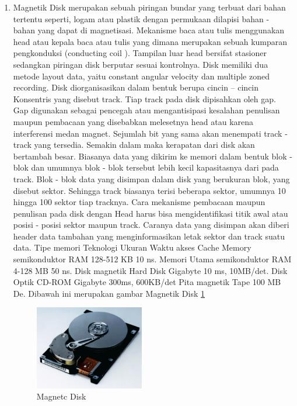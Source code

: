 \begin{enumerate}
\item Magnetik Disk merupakan sebuah piringan bundar yang terbuat dari bahan tertentu seperti, logam atau plastik dengan permukaan dilapisi bahan - bahan yang dapat di magnetisasi. Mekanisme baca atau tulis menggunakan head atau kepala baca atau tulis yang dimana merupakan sebuah kumparan pengkonduksi (conducting coil ). Tampilan luar head bersifat stasioner sedangkan piringan disk berputar sesuai kontrolnya. Disk memiliki dua metode layout data, yaitu  constant angular velocity dan multiple zoned recording. Disk diorganisasikan dalam bentuk berupa cincin – cincin
Konsentris yang disebut track. Tiap track pada disk dipisahkan oleh gap. Gap digunakan sebagai pencegah atau mengantisipasi kesalahan penulisan maupun pembacaan yang disebabkan melesetnya head atau karena interferensi medan magnet. Sejumlah bit yang sama akan menempati track - track yang tersedia. Semakin dalam maka kerapatan dari disk akan bertambah besar. Biasanya data yang dikirim ke memori dalam bentuk blok - blok dan umumnya blok - blok tersebut lebih kecil kapasitasnya dari pada track. Blok - blok data yang disimpan dalam disk yang berukuran blok, yang disebut sektor. Sehingga track biasanya terisi beberapa sektor, umumnya 10 hingga 100 sektor tiap tracknya. Cara mekanisme pembacaan maupun penulisan pada disk dengan Head harus bisa mengidentifikasi titik awal atau posisi - posisi sektor maupun track. Caranya data yang disimpan akan diberi header data tambahan yang menginformasikan letak sektor dan track suatu data. Tipe memori Teknologi Ukuran Waktu akses Cache Memory semikonduktor RAM 128-512 KB 10 ns. Memori Utama semikonduktor RAM 4-128 MB 50 ns. Disk magnetik Hard Disk Gigabyte 10 ms, 10MB/det. Disk Optik CD-ROM Gigabyte 300ms, 600KB/det Pita magnetik Tape 100 MB De. Dibawah ini merupakan gambar Magnetik Disk
\ref{labelgambar4}
\begin{figure}[htbp]
\centering
\includegraphics[width=0.45\textwidth]{figures/image/magnetic_disk.jpg}
\caption{Magnetc Disk}
\label{labelgambar4}
\end{figure}

\end{enumerate}



